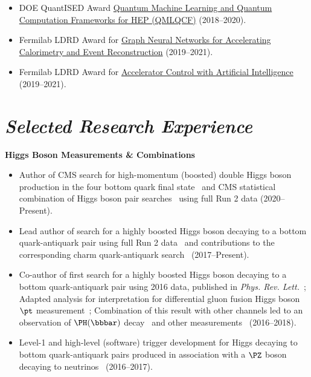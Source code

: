 \documentclass[11pt]{res}
\newcommand{\MarginText}[1]{\section{\textit{#1}}}
\begin{document}
\begin{resume}
\begin{itemize}
    \item DOE QuantISED Award \href{https://pamspublic.science.energy.gov/WebPAMSExternal/Interface/Common/ViewPublicAbstract.aspx?rv=1f7d4729-6f93-40bd-a55f-c108545b1ea9&rtc=24&PRoleId=10}{Quantum Machine Learning and Quantum Computation Frameworks for HEP (QMLQCF)} ({2018--2020}).
    \item Fermilab LDRD Award for \href{https://ldrd.fnal.gov/subdir/FNAL-LDRD-2019-017-D1.pdf}{Graph Neural Networks for Accelerating Calorimetry and Event Reconstruction} ({2019--2021}).
    \item Fermilab LDRD Award for \href{https://ldrd.fnal.gov/subdir/FNAL-LDRD-2019-027-D1.pdf}{Accelerator Control with Artificial Intelligence} ({2019--2021}).
  \end{itemize}

  \MarginText{Selected Research Experience}

  \textbf{Higgs Boson Measurements \& Combinations}
  \begin{itemize}
    \itemsep-0.3em
    \item Author of CMS search for high-momentum (boosted) double Higgs boson production in the four bottom quark final state~\cite{CMS:2022nmn} and CMS statistical combination of Higgs boson pair searches~\cite{CMS:2022dwd} using full Run 2 data ({2020--Present}).
    \item Lead author of search for a highly boosted Higgs boson decaying to a bottom quark-antiquark pair using full Run 2 data~\cite{Sirunyan:2020hwz} and contributions to the corresponding charm quark-antiquark search~\cite{CMS:2022wqf} ({2017--Present}).
    \item Co-author of first search for a highly boosted Higgs boson decaying to a bottom quark-antiquark pair using 2016 data, published in \emph{Phys. Rev. Lett.}~\cite{Sirunyan:2017dgc}; Adapted analysis for interpretation for differential gluon fusion Higgs boson $\pt$ measurement~\cite{Sirunyan:2018sgc}; Combination of this result with other channels led to an observation of $\PH(\bbbar)$ decay~\cite{Sirunyan:2018kst} and other measurements~\cite{Sirunyan:2018koj} ({2016--2018}).
    \item Level-1 and high-level (software) trigger development for Higgs decaying to bottom quark-antiquark pairs produced in association with a $\PZ$ boson decaying to neutrinos~\cite{Sirunyan:2018kst} ({2016--2017}).
  \end{itemize}


\end{resume}
\end{document}
